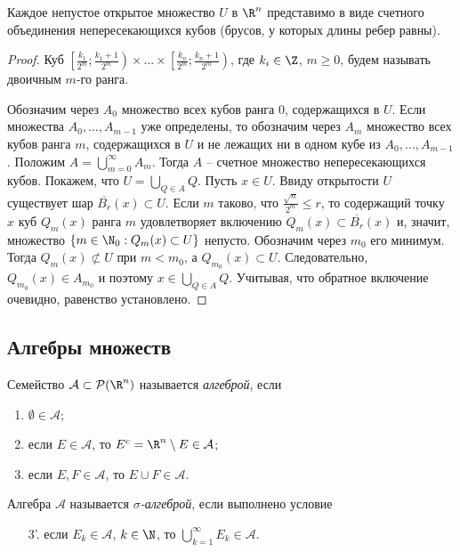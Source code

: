 
\begin{lemma}
    \label{lebeg-lem1}
    Каждое непустое открытое множество $U$ в $\R^{n}$ представимо в виде счетного объединения непересекающихся кубов (брусов, у которых длины ребер равны).
\end{lemma}

\begin{proof}
    Куб $\left[\frac{k_{1}}{2^{m}};\frac{k_{1} + 1}{2^{m}}\right) \times \ldots \times \left[\frac{k_{n}}{2^{m}};\frac{k_{n} + 1}{2^{m}}\right)$, где $k_{i} \in \Z$, $m \geq 0$, будем называть двоичным $m$-го ранга.

    Обозначим через $A_{0}$ множество всех кубов ранга 0, содержащихся в $U$. Если множества $A_{0}, \ldots, A_{m - 1}$ уже определены, то обозначим через $A_{m}$ множество всех кубов ранга $m$, содержащихся в $U$ и не лежащих ни в одном кубе из $A_{0}, \ldots, A_{m - 1}$. Положим $A = \bigcup_{m = 0}^{\infty}A_{m}$. Тогда $A$ -- счетное множество непересекающихся кубов. Покажем, что $U = \bigcup_{Q \in A}Q$. Пусть $x \in U$. Ввиду открытости $U$ существует шар $\overline{B_{r}}(x) \subset U$. Если $m$ таково, что $\frac{\sqrt{n}}{2^{m}} \leq r$, то содержащий точку $x$ куб $Q_{m}(x)$ ранга $m$ удовлетворяет включению $Q_{m}(x) \subset \overline{B_{r}}(x)$ и, значит, множество $\{m \in \N_{0}: Q_{m}(x) \subset U\}$ непусто. Обозначим через $m_{0}$ его минимум. Тогда $Q_{m}(x) \not\subset U$ при $m < m_{0}$, а $Q_{m_{0}}(x) \subset U$. Следовательно, $Q_{m_{0}}(x) \in A_{m_{0}}$ и поэтому $x \in \bigcup_{Q \in A}Q$. Учитывая, что обратное включение очевидно, равенство установлено.
\end{proof}

\subsection{Алгебры множеств}

\begin{definition}
    Семейство $\mathcal{A} \subset \mathcal{P}(\R^{n})$ называется \textit{алгеброй}, если 

    \begin{enumerate}
        \item $\emptyset \in \mathcal{A}$;
        \item если $E \in \mathcal{A}$, то $E^{c} = \R^{n} \setminus E \in \mathcal{A}$;
        \item если $E, F \in \mathcal{A}$, то $E \cup F \in \mathcal{A}$.
    \end{enumerate}

    Алгебра $\mathcal{A}$ называется \textit{$\sigma$-алгеброй}, если выполнено условие
    
    \begin{enumerate}
        \item[3'.] если $E_{k} \in \mathcal{A}$, $k \in \N$, то $\bigcup_{k = 1}^{\infty}E_{k} \in \mathcal{A}$.
    \end{enumerate}
\end{definition}

